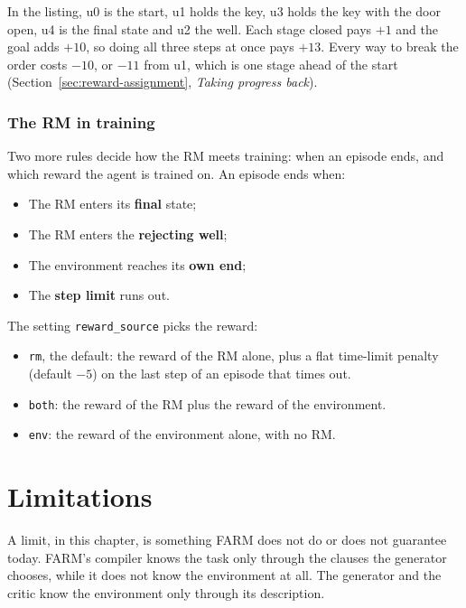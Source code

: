\documentclass[11pt,english,listoffigures,listoftables]{tfgetsinf}
\newcommand{\gain}[1]{\textcolor{green!40!black}{\bfseries\boldmath #1}}  %
\newcommand{\loss}[1]{\textcolor{red!60!black}{\bfseries\boldmath #1}}  %
\begin{document}
In the listing, u0 is the start, u1 holds the key, u3 holds the key with the door open, u4 is the final state and u2 the well. Each stage closed pays \gain{$+1$} and the goal adds \gain{$+10$}, so doing all three steps at once pays \gain{$+13$}. Every way to break the order costs \loss{$-10$}, or \loss{$-11$} from u1, which is one stage ahead of the start (Section~\ref{sec:reward-assignment}, \emph{Taking progress back}).

\subsection{The RM in training}
Two more rules decide how the RM meets training: when an episode ends, and which reward the agent is trained on. An episode ends when:
\begin{itemize}
    \item The RM enters its \textbf{final} state;
    \item The RM enters the \textbf{rejecting well};
    \item The environment reaches its \textbf{own end};
    \item The \textbf{step limit} runs out.
\end{itemize}


\noindent The setting \texttt{reward\_source} picks the reward:
\begin{itemize}
    \item \texttt{rm}, the default: the reward of the RM alone, plus a flat time-limit penalty (default \loss{$-5$}) on the last step of an episode that times out.
    \item \texttt{both}: the reward of the RM plus the reward of the environment.
    \item \texttt{env}: the reward of the environment alone, with no RM.
\end{itemize}


\chapter{Limitations}
\label{chap:limitations}

A limit, in this chapter, is something FARM does not do or does not guarantee today. FARM's compiler knows the task only through the clauses the generator chooses, while it does not know the environment at all. The generator and the critic know the environment only through its description.
\end{document}
